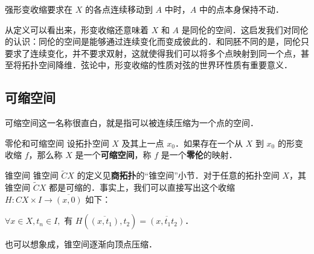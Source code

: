 强形变收缩要求在 $X$ 的各点连续移动到 $A$ 中时，$A$ 中的点本身保持不动．

从定义可以看出来，形变收缩还意味着 $X$ 和 $A$ 是同伦的空间．这启发我们对同伦的认识：同伦的空间是能够通过连续变化而变成彼此的．和同胚不同的是，同伦只要求了连续变化，并不要求双射，这就使得我们可以将多个点映射到同一个点，甚至将拓扑空间降维．弦论中，形变收缩的性质对弦的世界环性质有重要意义．

\subsection{可缩空间}
可缩空间这一名称很直白，就是指可以被连续压缩为一个点的空间．

\begin{definition}{零伦和可缩空间}
设拓扑空间 $X$ 及其上一点 $x_0$．如果存在一个从 $X$ 到 $x_0$ 的形变收缩 $f$，那么称 $X$ 是一个\textbf{可缩空间}，称 $f$ 是一个\textbf{零伦}的映射．
\end{definition}

\begin{example}{锥空间}
锥空间 $\widetilde{C}X$ 的定义见\textbf{商拓扑}的“锥空间”小节．对于任意的拓扑空间 $X$，其锥空间 $\widetilde{C}X$ 都是可缩的．事实上，我们可以直接写出这个收缩 $H:CX\times I\rightarrow\overline{(x, 0)}$ 如下：

$\forall x\in X, t_n\in I, $ 有 $H(\overline{(x, t_1)}, t_2)=\overline{(x, t_1t_2)}$．

也可以想象成，锥空间逐渐向顶点压缩．
\end{example}


